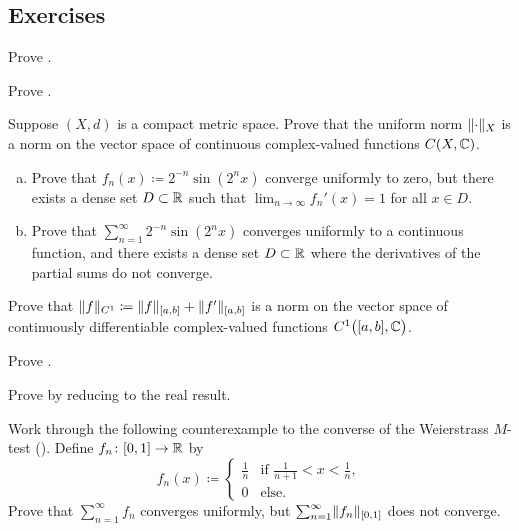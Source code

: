 \subsection{Exercises}

\begin{exercise}
Prove .
\end{exercise}

\begin{exercise}
Prove .
\end{exercise}

\begin{exercise} \label{exercise:CXCnormedspace}
Suppose $(X,d)$ is a compact metric space.
Prove that the uniform norm $\lVert {\cdot} \rVert_X$ is a norm on the vector space of
continuous complex-valued functions $C(X,{\mathbb{C}})$.
\end{exercise}

\begin{exercise}
\pagebreak[2]
\leavevmode
\begin{enumerate}[a)]
\item
Prove that
$f_n(x) \coloneqq 2^{-n} \sin(2^n x)$
converge uniformly to zero, but there exists a dense set $D \subset {\mathbb{R}}$
such that $\lim_{n\to\infty} f_n'(x) = 1$ for all $x \in D$.
\item
Prove that
$\sum_{n=1}^\infty 2^{-n} \sin(2^n x)$
converges uniformly to a continuous function,
and there exists a dense set $D \subset {\mathbb{R}}$
where the derivatives of the partial sums do not converge.
\end{enumerate}
\end{exercise}

\begin{exercise}
Prove that $\lVert {f} \rVert_{C^1} \coloneqq \lVert {f} \rVert_{[a,b]}+\lVert {f'} \rVert_{[a,b]}$
is a norm on the vector space of
continuously differentiable complex-valued functions $C^1\bigl([a,b],{\mathbb{C}}\bigr)$.
\end{exercise}

\begin{exercise}
Prove .
\end{exercise}

\begin{exercise}
Prove  by reducing to the real
result.
\end{exercise}

\begin{exercise}
Work through the following counterexample to the converse of
the Weierstrass $M$-test ().  Define
$f_n \colon [0,1] \to {\mathbb{R}}$ by
\begin{equation*}
f_n(x) \coloneqq
\begin{cases}
\frac{1}{n} & \text{if } \frac{1}{n+1} < x < \frac{1}{n},\\
0	    & \text{else.}
\end{cases}
\end{equation*}
Prove that $\sum_{n=1}^\infty f_n$ converges uniformly, but
$\sum_{n=1}^\infty \lVert {f_n} \rVert_{[0,1]}$
does not converge.
\end{exercise}

